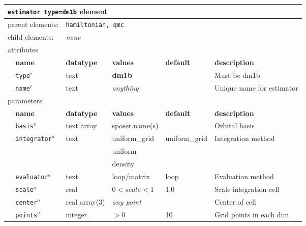 \FloatBarrier
\begin{table}[h]
\begin{center}
\begin{tabularx}{\textwidth}{l l l l l l }
\hline
\multicolumn{6}{l}{\texttt{estimator type=dm1b} element} \\
\hline
\multicolumn{2}{l}{parent elements:} & \multicolumn{4}{l}{\texttt{hamiltonian, qmc}}\\
\multicolumn{2}{l}{child  elements:} & \multicolumn{4}{l}{\textit{none}}\\
\multicolumn{2}{l}{attributes}  & \multicolumn{4}{l}{}\\
   &   \bfseries name     & \bfseries datatype & \bfseries values & \bfseries default   & \bfseries description \\
   & \texttt{type}$^r$    &  text              & \textbf{dm1b}    &                     & Must be dm1b     \\
   & \texttt{name}$^r$    &  text              & \textit{anything}&                     & Unique name for estimator \\
\multicolumn{2}{l}{parameters}  & \multicolumn{4}{l}{}\\
   &   \bfseries name     & \bfseries datatype & \bfseries values & \bfseries default   & \bfseries description \\
   &\texttt{basis}$^r$         &  text array   & sposet.name(s)   &                     & Orbital basis         \\
   &\texttt{integrator}$^o$    &  text         & uniform\_grid    & uniform\_grid       & Integration method    \\
   &                           &               & uniform          &                     &                       \\
   &                           &               & density          &                     &                       \\
   &\texttt{evaluator}$^o$     &  text         & loop/matrix      & loop                & Evaluation method     \\
   &\texttt{scale}$^o$         &  real         & $0<scale<1$      & 1.0                 & Scale integration cell\\
   &\texttt{center}$^o$        &  real array(3)&\textit{any point}&                     & Center of cell        \\
   &\texttt{points}$^o$        &  integer      & $>0$             & 10                  & Grid points in each dim\\

\end{tabularx}
\end{center}
\end{table}
